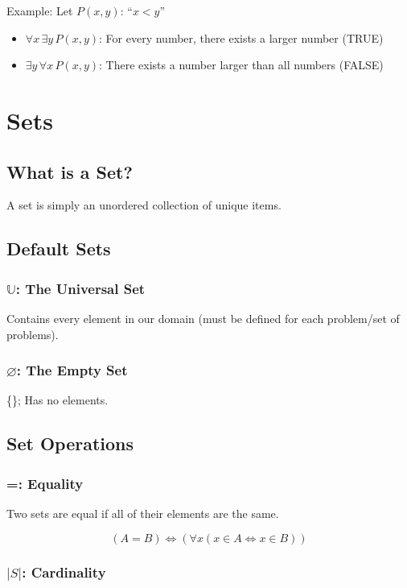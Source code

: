 \documentclass{report}
\begin{document}
Example: Let $P(x, y)$: ``$x < y$''
\begin{itemize}
    \item $\forall x \, \exists y \, P(x, y)$: For every number, there exists a larger number (TRUE)
    \item $\exists y \, \forall x \, P(x, y)$: There exists a number larger than all numbers (FALSE)
\end{itemize}

\chapter{Sets}

\section{What is a Set?}

A set is simply an unordered collection of unique items.

\section{Default Sets}

\subsection{$\mathbb{U}$: The Universal Set}
Contains every element in our domain (must be defined for each problem/set of problems).

\subsection{$\varnothing$: The Empty Set} 
\{\}; Has no elements.

\section{Set Operations}

\subsection{=: Equality}

Two sets are equal if all of their elements are the same.

\begin{equation}
    (A = B) \iff (\forall x (x \in A \iff x \in B))
\end{equation}

\subsection{$\vert S\vert$: Cardinality}
\end{document}

